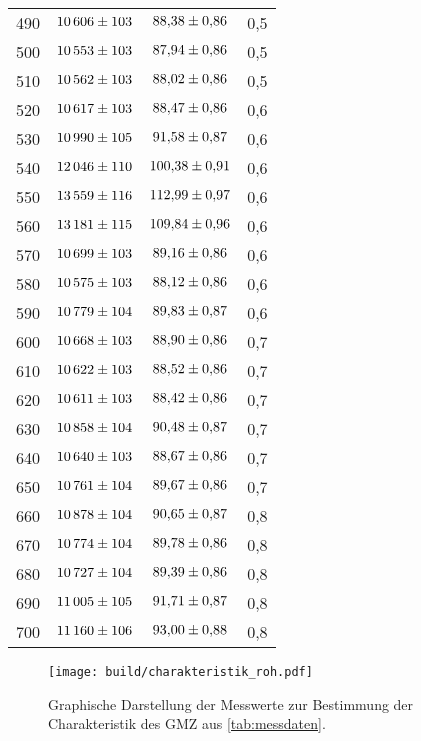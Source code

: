 \begin{longtable}{c c c c}
    490 & $\num{10606+-103}$ & $\num{ 88.38+-0.86}$ & 0,5 \\
    500 & $\num{10553+-103}$ & $\num{ 87.94+-0.86}$ & 0,5 \\
    510 & $\num{10562+-103}$ & $\num{ 88.02+-0.86}$ & 0,5 \\
    520 & $\num{10617+-103}$ & $\num{ 88.47+-0.86}$ & 0,6 \\
    530 & $\num{10990+-105}$ & $\num{ 91.58+-0.87}$ & 0,6 \\
    540 & $\num{12046+-110}$ & $\num{100.38+-0.91}$ & 0,6 \\
    550 & $\num{13559+-116}$ & $\num{112.99+-0.97}$ & 0,6 \\
    560 & $\num{13181+-115}$ & $\num{109.84+-0.96}$ & 0,6 \\
    570 & $\num{10699+-103}$ & $\num{ 89.16+-0.86}$ & 0,6 \\
    580 & $\num{10575+-103}$ & $\num{ 88.12+-0.86}$ & 0,6 \\
    590 & $\num{10779+-104}$ & $\num{ 89.83+-0.87}$ & 0,6 \\
    600 & $\num{10668+-103}$ & $\num{ 88.90+-0.86}$ & 0,7 \\
    610 & $\num{10622+-103}$ & $\num{ 88.52+-0.86}$ & 0,7 \\
    620 & $\num{10611+-103}$ & $\num{ 88.42+-0.86}$ & 0,7 \\
    630 & $\num{10858+-104}$ & $\num{ 90.48+-0.87}$ & 0,7 \\
    640 & $\num{10640+-103}$ & $\num{ 88.67+-0.86}$ & 0,7 \\
    650 & $\num{10761+-104}$ & $\num{ 89.67+-0.86}$ & 0,7 \\
    660 & $\num{10878+-104}$ & $\num{ 90.65+-0.87}$ & 0,8 \\
    670 & $\num{10774+-104}$ & $\num{ 89.78+-0.86}$ & 0,8 \\
    680 & $\num{10727+-104}$ & $\num{ 89.39+-0.86}$ & 0,8 \\
    690 & $\num{11005+-105}$ & $\num{ 91.71+-0.87}$ & 0,8 \\
    700 & $\num{11160+-106}$ & $\num{ 93.00+-0.88}$ & 0,8 \\
    \bottomrule
\end{longtable}

\begin{figure}
    \centering
    \texttt{[image: build/charakteristik\_roh.pdf]}
    \caption{Graphische Darstellung der Messwerte zur Bestimmung der Charakteristik des GMZ aus%
    \autoref{tab:messdaten}.}
    \label{fig:charakteristik_roh}
\end{figure}

